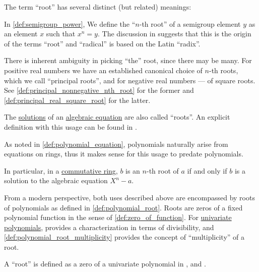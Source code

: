 \begin{remark}\label{rem:root_terminology}
  The term \enquote{root} has several distinct (but related) meanings:
  \begin{thmenum}
     In \cref{def:semigroup_power}, We define the \enquote{\( n \)-th root} of a semigroup element \( y \) as an element \( x \) such that \( x^n = y \). The discussion in \cite{HSMSE:radical_symbol_history} suggests that this is the origin of the terms \enquote{root} and \enquote{radical} is based on the Latin \enquote{radix}.

    There is inherent ambiguity in picking \enquote{the} root, since there may be many. For positive real numbers we have an established canonical choice of \( n \)-th roots, which we call \enquote{principal roots}, and for negative real numbers --- of square roots. See \cref{def:principal_nonnegative_nth_root} for the former and \cref{def:principal_real_square_root} for the latter.

     The \hyperref[def:fol_equation/semantic_solution]{solutions} of an \hyperref[def:polynomial_equation]{algebraic equation} are also called \enquote{roots}. An explicit definition with this usage can be found in \cite[2]{Обрешков1962ВисшаАлгебра}.

    As noted in \cref{def:polynomial_equation}, polynomials naturally arise from equations on rings, thus it makes sense for this usage to predate polynomials.

    In particular, in a \hyperref[def:ring/commutative]{commutative ring}, \( b \) is an \( n \)-th root of \( a \) if and only if \( b \) is a solution to the algebraic equation \( X^n - a \).

     From a modern perspective, both uses described above are encompassed by roots of polynomials as defined in \cref{def:polynomial_root}. Roots are zeros of a fixed polynomial function in the sense of \cref{def:zero_of_function}. For \hyperref[def:univariate_polynomial]{univariate polynomials},  provides a characterization in terms of divisibility, and \cref{def:polynomial_root_multiplicity} provides the concept of \enquote{multiplicity} of a root.

    A \enquote{root} is defined as a zero of a univariate polynomial in
    \cite[282]{Aluffi2009Algebra},
    \cite[11]{Knapp2016BasicAlgebra} and
    \cite[119]{Тыртышников2017ОсновыАлгебры}.
  \end{thmenum}
\end{remark}

